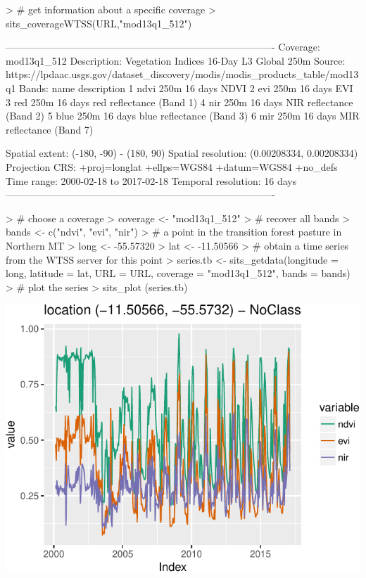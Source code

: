 \documentclass[article]{jss}
\begin{document}
\begin{CodeChunk}

\begin{CodeInput}
> # get information about a specific coverage
> sits_coverageWTSS(URL,"mod13q1_512")
\end{CodeInput}

\begin{CodeOutput}
----------------------------------------------------------------------------------
Coverage: mod13q1_512
Description: Vegetation Indices 16-Day L3 Global 250m
Source: https://lpdaac.usgs.gov/dataset_discovery/modis/modis_products_table/mod13q1
Bands: 
  name                            description
1 ndvi                      250m 16 days NDVI
2  evi                       250m 16 days EVI
3  red  250m 16 days red reflectance (Band 1)
4  nir  250m 16 days NIR reflectance (Band 2)
5 blue 250m 16 days blue reflectance (Band 3)
6  mir  250m 16 days MIR reflectance (Band 7)

Spatial extent: (-180, -90) - (180, 90)
Spatial resolution: (0.00208334, 0.00208334)
Projection CRS: +proj=longlat +ellps=WGS84 +datum=WGS84 +no_defs
Time range: 2000-02-18 to 2017-02-18
Temporal resolution: 16 days 
----------------------------------------------------------------------------------
\end{CodeOutput}

\begin{CodeInput}
> # choose a coverage
> coverage <- "mod13q1_512"
> # recover all bands
> bands <- c("ndvi", "evi", "nir")
> # a point in the transition forest pasture in Northern MT
> long <- -55.57320
> lat <- -11.50566
> # obtain a time series from the WTSS server for this point
> series.tb <- sits_getdata(longitude = long, latitude = lat, URL = URL, coverage = "mod13q1_512", bands = bands)
> # plot the series
> sits_plot (series.tb)
\end{CodeInput}


\begin{center}\includegraphics{sits_files/figure-latex/unnamed-chunk-4-1} \end{center}

\end{CodeChunk}


\end{document}
